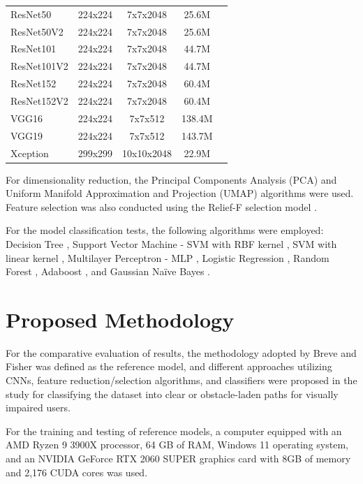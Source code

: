\documentclass[preprint,12pt]{elsarticle}
\begin{document}
\begin{table}[h!]
{\begin{tabular}{|l|c|c|c|c|}
			ResNet50 & 224x224 & 7x7x2048 & 25.6M & \cite{he2016} \\
			ResNet50V2 & 224x224 & 7x7x2048 & 25.6M & \cite{zhang2016} \\
			ResNet101 & 224x224 & 7x7x2048 & 44.7M & \cite{he2016} \\
			ResNet101V2 & 224x224 & 7x7x2048 & 44.7M & \cite{zhang2016} \\
			ResNet152 & 224x224 & 7x7x2048 & 60.4M & \cite{he2016} \\
			ResNet152V2 & 224x224 & 7x7x2048 & 60.4M & \cite{zhang2016} \\
			VGG16 & 224x224 & 7x7x512 & 138.4M & \cite{simonyan2015} \\
			VGG19 & 224x224 & 7x7x512 & 143.7M & \cite{simonyan2015} \\
			Xception & 299x299 & 10x10x2048 & 22.9M & \cite{chollet2017} \\
			\hline
		\end{tabular}%
	}
\end{table}

For dimensionality reduction, the Principal Components Analysis (PCA) \cite{jolliffe2002} and Uniform Manifold Approximation and Projection (UMAP) \cite{mcinnes2021} algorithms were used. Feature selection was also conducted using the Relief-F selection model \cite{kononenko1994}.

For the model classification tests, the following algorithms were employed: Decision Tree \cite{priyanka2020}, Support Vector Machine - SVM with RBF kernel \cite{liu2011}, SVM with linear kernel \cite{lorena2003}, Multilayer Perceptron - MLP \cite{pereira2013}, Logistic Regression \cite{ekstrom2018}, Random Forest \cite{breiman2001}, Adaboost \cite{zhu2009}, and Gaussian Naïve Bayes \cite{gayathri2016}.

\section{Proposed Methodology}

For the comparative evaluation of results, the methodology adopted by Breve and Fisher \cite{breve2020} was defined as the reference model, and different approaches utilizing CNNs, feature reduction/selection algorithms, and classifiers were proposed in the study for classifying the dataset into clear or obstacle-laden paths for visually impaired users.

For the training and testing of reference models, a computer equipped with an AMD Ryzen 9 3900X processor, 64 GB of RAM, Windows 11 operating system, and an NVIDIA GeForce RTX 2060 SUPER graphics card with 8GB of memory and 2,176 CUDA cores was used.
\end{document}
